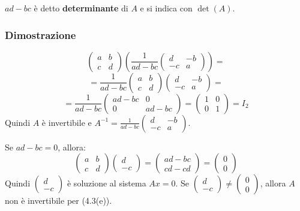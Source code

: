 \documentclass[a4paper]{article}
\theoremstyle{break}
\theoremstyle{break}
\theoremstyle{break}
\theoremstyle{break}
\begin{document}
\vspace{1em}
\noindent \( ad-bc \) è detto \textbf{determinante} di \( A \) e si indica con \( \det(A) \).
\subsubsection{Dimostrazione}
\[
  \begin{pmatrix} 
    a & b\\
    c & d
  \end{pmatrix} 
  \left( 
    \frac{1}{ad-bc}
    \begin{pmatrix} 
      d & -b\\
      -c & a
    \end{pmatrix} 
  \right) =
\] 
\[
  = \frac{1}{ad-bc}
  \begin{pmatrix} 
    a & b\\
    c & d
  \end{pmatrix} 
  \begin{pmatrix} 
    d & -b\\
    -c & a
  \end{pmatrix} 
  =
\] 
\[
  = \frac{1}{ad-bc}
  \begin{pmatrix} 
    ad-bc & 0\\
    0 & ad-bc
  \end{pmatrix} 
  =
  \begin{pmatrix} 
    1 & 0\\
    0 & 1
  \end{pmatrix} 
  = I_2
\] 
Quindi \( A \) è invertibile e \( A^{-1} = \frac{1}{ad-bc} \begin{pmatrix} 
  d & -b\\
  -c & a
\end{pmatrix}  \).

\vspace{1em}
\noindent Se \( ad-bc = 0 \), allora:
\[
  \begin{pmatrix} 
    a & b\\
    c & d
  \end{pmatrix} 
  \begin{pmatrix} 
    d\\-c
  \end{pmatrix} 
  =
  \begin{pmatrix} 
    ad-bc\\
    cd-cd
  \end{pmatrix} 
  =
  \begin{pmatrix} 
    0\\0
  \end{pmatrix}
\] 
Quindi \( \begin{pmatrix} d\\-c \end{pmatrix}  \) è soluzione al sistema \( Ax=0 \).
Se \( \begin{pmatrix} d\\-c \end{pmatrix} \neq \begin{pmatrix} 0\\0 \end{pmatrix}  \),
allora \( A \) non è invertibile per (4.3(e)).
\end{document}
